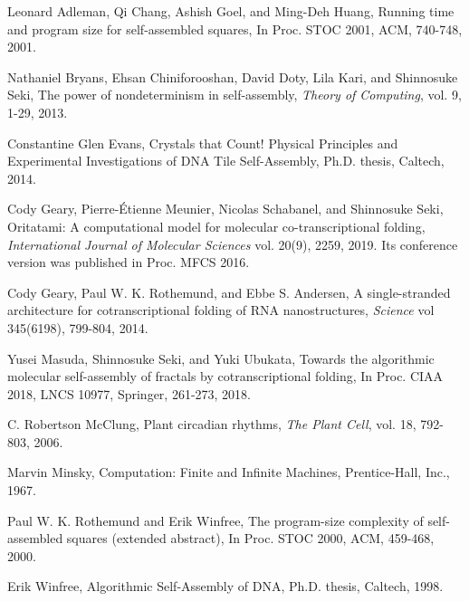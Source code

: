 \documentclass[runningheads]{llncs}
\begin{document}
\begin{thebibliography}{1}

Leonard Adleman, Qi Chang, Ashish Goel, and Ming-Deh Huang, 
Running time and program size for self-assembled squares, 
In Proc. STOC 2001, ACM, 740-748, 2001. 

Nathaniel Bryans, Ehsan Chiniforooshan, David Doty, Lila Kari, and Shinnosuke Seki, 
The power of nondeterminism in self-assembly, 
\textit{Theory of Computing}, vol. 9, 1-29, 2013.

Constantine Glen Evans, 
Crystals that Count! Physical Principles and Experimental Investigations of {DNA} Tile Self-Assembly, 
Ph.D. thesis, Caltech, 2014.

Cody Geary, Pierre-\'{E}tienne Meunier, Nicolas Schabanel, and Shinnosuke Seki, 
Oritatami: A computational model for molecular co-transcriptional folding, 
\textit{International Journal of Molecular Sciences} vol. 20(9), 2259, 2019. Its conference version was published in Proc. MFCS 2016. 

Cody Geary, Paul W. K. Rothemund, and Ebbe S. Andersen, 
A single-stranded architecture for cotranscriptional folding of {RNA} nanostructures, 
\textit{Science} vol 345(6198), 799-804, 2014.

Yusei Masuda, Shinnosuke Seki, and Yuki Ubukata, 
Towards the algorithmic molecular self-assembly of fractals by cotranscriptional folding, 
In Proc. CIAA 2018, LNCS 10977, Springer, 261-273, 2018.

C. Robertson McClung, 
Plant circadian rhythms, 
\textit{The Plant Cell}, vol. 18, 792-803, 2006.

Marvin Minsky, 
Computation: Finite and Infinite Machines, 
Prentice-Hall, Inc., 1967. 

Paul W. K. Rothemund and Erik Winfree, 
The program-size complexity of self-assembled squares (extended abstract), 
In Proc. STOC 2000, ACM, 459-468, 2000.

Erik Winfree, 
Algorithmic Self-Assembly of {DNA}, 
Ph.D. thesis, Caltech, 1998.

\end{thebibliography}



  
\end{document}
